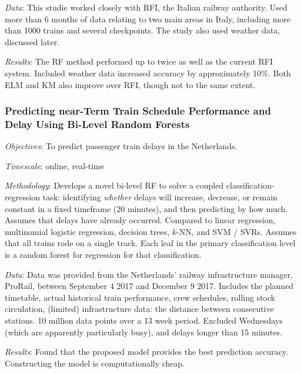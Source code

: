 \documentclass{article}
\begin{document}
\smallskip

\textit{Data}: This studie worked closely with RFI, the Italian railway authority. Used more than 6 months of data relating to two main areas in Italy, including more than 1000 trains and several checkpoints. The study also used weather data, discussed later. 

\smallskip

\textit{Results}: The RF method performed up to twice as well as the current RFI system. Included weather data increased accuracy by approximately 10\%. Both ELM and KM also improve over RFI, though not to the same extent. 

\subsubsection{Predicting near-Term Train Schedule Performance and Delay Using Bi-Level Random Forests \cite{nabian_et_al_2019}}

\textit{Objectives}: To predict passenger train delays in the Netherlands.

\smallskip

\textit{Timescale}: online, real-time

\smallskip

\textit{Methodology}: Develops a novel bi-level RF to solve a coupled classification-regression task: identifying \textit{whether} delays will increase, decrease, or remain constant in a fixed timeframe (20 minutes), and then predicting by how much. Assumes that delays have already occurred. Compared to linear regression, multinomial logistic regression, decision trees, $k$-NN, and SVM / SVRs. Assumes that all trains rode on a single track. Each leaf in the primary classification level is a random forest for regression for that classification.

\smallskip

\textit{Data}: Data was provided from the Netherlands' railway infrastructure manager, ProRail, between September 4 2017 and December 9 2017. Includes the planned timetable, actual historical train performance, crew schedules, rolling stock circulation, (limited) infrastructure data: the distance between consecutive stations. 10 million data points over a 13 week period. Excluded Wednesdays (which are apparently particularly busy), and delays longer than 15 minutes.

\smallskip

\textit{Results}: Found that the proposed model provides the best prediction accuracy. Constructing the model is computationally cheap.
\end{document}
